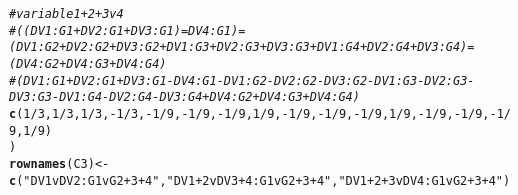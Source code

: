 \documentclass{article}\usepackage[]{graphicx}\usepackage[]{color}
\makeatletter
\newcommand{\hlnum}[1]{\textcolor[rgb]{0.686,0.059,0.569}{#1}}%
\newcommand{\hlstr}[1]{\textcolor[rgb]{0.192,0.494,0.8}{#1}}%
\newcommand{\hlcom}[1]{\textcolor[rgb]{0.678,0.584,0.686}{\textit{#1}}}%
\newcommand{\hlopt}[1]{\textcolor[rgb]{0,0,0}{#1}}%
\newcommand{\hlstd}[1]{\textcolor[rgb]{0.345,0.345,0.345}{#1}}%
\newcommand{\hlkwb}[1]{\textcolor[rgb]{0.69,0.353,0.396}{#1}}%
\newcommand{\hlkwd}[1]{\textcolor[rgb]{0.737,0.353,0.396}{\textbf{#1}}}%
\newenvironment{kframe}{%
 \def\at@end@of@kframe{}%
 \ifinner\ifhmode%
  \def\at@end@of@kframe{\end{minipage}}%
  \begin{minipage}{\columnwidth}%
 \fi\fi%
 \def\FrameCommand##1{\hskip\@totalleftmargin \hskip-\fboxsep
 \colorbox{shadecolor}{##1}\hskip-\fboxsep
     \hskip-\linewidth \hskip-\@totalleftmargin \hskip\columnwidth}%
 \MakeFramed {\advance\hsize-\width
   \@totalleftmargin\z@ \linewidth\hsize
   \@setminipage}}%
 {\par\unskip\endMakeFramed%
 \at@end@of@kframe}
\newenvironment{knitrout}{}{} %
\makeatother
\begin{document}
\begin{knitrout}
\begin{kframe}
\begin{alltt}
  \hlcom{# variable 1 + 2 + 3 v 4}
  \hlcom{# ((DV1:G1 + DV2:G1 + DV3:G1) = DV4:G1) = (DV1:G2 + DV2:G2 + DV3:G2 + DV1:G3 + DV2:G3 + DV3:G3 + DV1:G4 + DV2:G4 + DV3:G4) = (DV4:G2 + DV4:G3 + DV4:G4)}
  \hlcom{# (DV1:G1 + DV2:G1 + DV3:G1 - DV4:G1 - DV1:G2 - DV2:G2 - DV3:G2 - DV1:G3 - DV2:G3 - DV3:G3 - DV1:G4 - DV2:G4 - DV3:G4 + DV4:G2 + DV4:G3 + DV4:G4)}
  \hlkwd{c}\hlstd{(}\hlnum{1}\hlopt{/}\hlnum{3}\hlstd{,}\hlnum{1}\hlopt{/}\hlnum{3}\hlstd{,}\hlnum{1}\hlopt{/}\hlnum{3}\hlstd{,}\hlopt{-}\hlnum{1}\hlopt{/}\hlnum{3}\hlstd{,} \hlopt{-}\hlnum{1}\hlopt{/}\hlnum{9}\hlstd{,}\hlopt{-}\hlnum{1}\hlopt{/}\hlnum{9}\hlstd{,}\hlopt{-}\hlnum{1}\hlopt{/}\hlnum{9}\hlstd{,}\hlnum{1}\hlopt{/}\hlnum{9}\hlstd{,} \hlopt{-}\hlnum{1}\hlopt{/}\hlnum{9}\hlstd{,}\hlopt{-}\hlnum{1}\hlopt{/}\hlnum{9}\hlstd{,}\hlopt{-}\hlnum{1}\hlopt{/}\hlnum{9}\hlstd{,}\hlnum{1}\hlopt{/}\hlnum{9}\hlstd{,} \hlopt{-}\hlnum{1}\hlopt{/}\hlnum{9}\hlstd{,}\hlopt{-}\hlnum{1}\hlopt{/}\hlnum{9}\hlstd{,}\hlopt{-}\hlnum{1}\hlopt{/}\hlnum{9}\hlstd{,}\hlnum{1}\hlopt{/}\hlnum{9}\hlstd{)}
\hlstd{)}
\hlkwd{rownames}\hlstd{(C3)} \hlkwb{<-} \hlkwd{c}\hlstd{(}\hlstr{"DV1vDV2:G1vG2+3+4"}\hlstd{,} \hlstr{"DV1+2vDV3+4:G1vG2+3+4"}\hlstd{,} \hlstr{"DV1+2+3vDV4:G1vG2+3+4"}\hlstd{)}
\end{alltt}
\end{kframe}
\end{knitrout}
\end{document}
